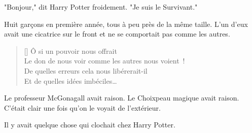 "Bonjour," dit Harry Potter froidement. "Je suis le Survivant."

Huit garçons en première année, tous à peu près de la même taille. L'un d'eux avait une cicatrice sur le front et ne se comportait pas comme les autres.

\baselineskip\settowidth{\versewidth}{Le don de nous voir comme les autres nous voient~!} \begin{verse}[\versewidth] Ô si un pouvoir nous offrait\\ Le don de nous voir comme les autres nous voient~!\\ De quelles erreurs cela nous libérerait-il\\ Et de quelles idées imbéciles… \end{verse}

Le professeur McGonagall avait raison. Le Choixpeau magique avait raison. C'était clair une fois qu'on le voyait de l'extérieur.

Il y avait quelque chose qui clochait chez Harry Potter.~ 

